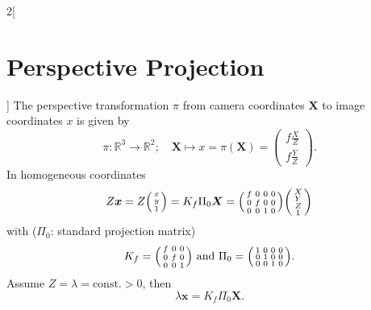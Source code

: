 \documentclass[oneside,fontsize=11pt,paper=a4]{scrartcl}
\begin{document}
\begin{multicols}{2}[\section{Perspective Projection}]
The perspective transformation $\pi$ from camera coordinates $\boldsymbol{X}$ to image coordinates $x$ is given by
\begin{equation*}
    \pi : \mathbb{R}^3 \rightarrow \mathbb{R}^2; \quad \boldsymbol{X} \mapsto x = \pi (\boldsymbol{X}) = \begin{pmatrix}f \frac{X}{Z}\\ f \frac{Y}{Z} \end{pmatrix}.
\end{equation*}
In homogeneous coordinates
\begin{equation*}
	Z\boldsymbol{x} = Z\begin{psmallmatrix} x\\ y\\ 1 \end{psmallmatrix} = K_f \Pi_0 \boldsymbol{X}
					= \begin{psmallmatrix} f & 0 & 0 & 0\\0 & f & 0 & 0\\0 & 0 & 1 & 0\end{psmallmatrix} \begin{psmallmatrix} X\\ Y\\ Z\\ 1 \end{psmallmatrix}		
\end{equation*}
with ($\Pi_0$: standard projection matrix)
\begin{equation*}
	K_f = \begin{psmallmatrix} f & 0 & 0\\0 & f & 0\\0 & 0 & 1\end{psmallmatrix} \text{  and  } \Pi_0 = \begin{psmallmatrix} 1 & 0 & 0 & 0\\0 & 1 & 0 & 0\\0 & 0 & 1 & 0\end{psmallmatrix}.
\end{equation*}
Assume $Z = \lambda = \text{const.} > 0$, then
\begin{equation*}
	\lambda \boldsymbol{x} = K_f \Pi_0 \boldsymbol{X}.
\end{equation*}


\end{multicols}
\end{document}
